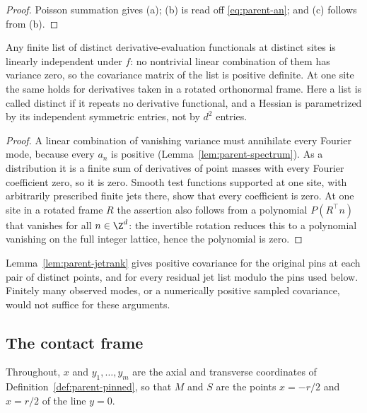 \begin{proof}
Poisson summation gives (a); (b) is read off \eqref{eq:parent-an}; and (c) follows from (b).
\end{proof}

\begin{lemma}\label{lem:parent-jetrank}
Any finite list of distinct derivative-evaluation functionals at distinct sites is linearly independent under $f$: no nontrivial linear combination of them has variance zero, so the covariance matrix of the list is positive definite. At one site the same holds for derivatives taken in a rotated orthonormal frame. Here a list is called distinct if it repeats no derivative functional, and a Hessian is parametrized by its independent symmetric entries, not by $d^2$ entries.
\end{lemma}

\begin{proof}
A linear combination of vanishing variance must annihilate every Fourier mode, because every $a_n$ is positive (Lemma~\ref{lem:parent-spectrum}). As a distribution it is a finite sum of derivatives of point masses with every Fourier coefficient zero, so it is zero. Smooth test functions supported at one site, with arbitrarily prescribed finite jets there, show that every coefficient is zero. At one site in a rotated frame $R$ the assertion also follows from a polynomial $P(R^{\top}n)$ that vanishes for all $n\in\Z^d$: the invertible rotation reduces this to a polynomial vanishing on the full integer lattice, hence the polynomial is zero.
\end{proof}

Lemma~\ref{lem:parent-jetrank} gives positive covariance for the original pins at each pair of distinct points, and for every residual jet list modulo the pins used below. Finitely many observed modes, or a numerically positive sampled covariance, would not suffice for these arguments.

\subsection{The contact frame}\label{ssec:parent-frame}

Throughout, $x$ and $y_1,\dots,y_m$ are the axial and transverse coordinates of Definition~\ref{def:parent-pinned}, so that $M$ and $S$ are the points $x=-r/2$ and $x=r/2$ of the line $y=0$.

